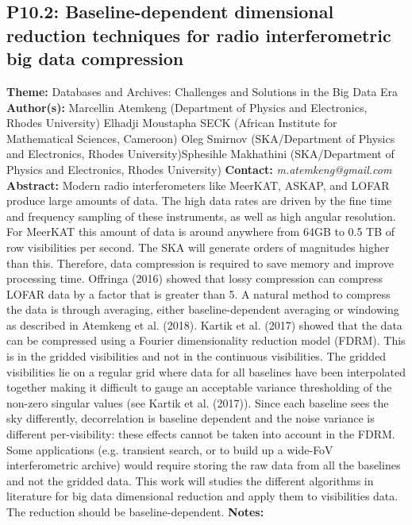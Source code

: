 \documentclass{report}
\begin{document}
{{{{{{{{{{{{\subsection*{P10.2: Baseline-dependent dimensional reduction techniques for radio interferometric big data compression}
{\bf Theme:}  Databases and Archives: Challenges and Solutions in the Big Data Era\newline
{\bf Author(s):}\newline
Marcellin Atemkeng (Department of Physics and Electronics, Rhodes University) \newline Elhadji Moustapha SECK (African Institute for Mathematical Sciences, Cameroon) \newline  Oleg Smirnov (SKA/Department of Physics and Electronics, Rhodes University)\newline  Sphesihle Makhathini (SKA/Department of Physics and Electronics, Rhodes University)\newline  \newline  \newline\newline
{\bf Contact:} {\it m.atemkeng@gmail.com}\newline
\newline\newline
{\bf Abstract:}\newline
Modern radio interferometers like MeerKAT, ASKAP, and LOFAR produce large amounts of data. The high data rates are driven by the fine time and frequency sampling of these instruments, as well as high angular resolution. For MeerKAT this amount of data is around anywhere from 64GB to 0.5 TB of row visibilities per second. The SKA will generate orders of magnitudes higher than this.
Therefore, data compression is required to save memory and improve processing time. Offringa (2016) showed that lossy compression can compress LOFAR data by a factor that is greater than 5. A natural method to compress the data is through averaging, either baseline-dependent averaging or windowing as described in Atemkeng et al. (2018). Kartik et al. (2017) showed that the data can be compressed using a Fourier dimensionality reduction model (FDRM). This is in the gridded visibilities and not in the continuous visibilities. The gridded visibilities lie on a regular grid where data for all baselines have been interpolated
together making it difficult to gauge an acceptable variance thresholding of the non-zero singular
values (see Kartik et al. (2017)). Since each baseline sees the sky differently, decorrelation is baseline dependent and the noise variance is different per-visibility: these effects cannot be taken into account in the FDRM. Some applications (e.g. transient search, or to build up a wide-FoV interferometric archive)
would require storing the raw data from all the baselines and not the gridded data.
This work will studies the different algorithms in literature for big data dimensional reduction and apply them to visibilities data. The reduction should be
baseline-dependent.\newline
{\bf Notes:}\newline
{\newpage
}}}}}}}}}}}}}
\end{document}
